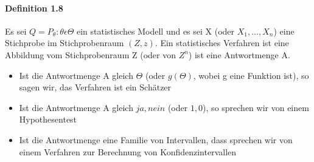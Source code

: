 \documentclass[paper=a4, fontsize=11pt]{scrartcl}
\numberwithin{equation}{section}
\numberwithin{figure}{section}
\numberwithin{table}{section}
\begin{document}
\paragraph{Definition 1.8}

Es sei $Q = {P_{\theta} : \theta \epsilon \Theta}$ ein statistisches Modell und es sei X (oder $X_{1}, ..., X_{n}$) eine Stichprobe im Stichprobenraum $(Z,z)$. Ein statistisches Verfahren ist eine Abbildung vom Stichprobenraum Z (oder von $Z^{n}$) ist eine Antwortmenge A.

\begin{itemize}
\item Ist die Antwortmenge A gleich $\Theta$ (oder $g(\Theta)$, wobei g eine Funktion ist), so sagen wir, das Verfahren ist ein Schätzer
\item Ist die Antwortmenge A gleich ${ja, nein}$ (oder ${1,0}$), so sprechen wir von einem Hypothesentest
\item Ist die Antwortmenge eine Familie von Intervallen, dass sprechen wir von einem Verfahren zur Berechnung von Konfidenzintervallen
\end{itemize}

\end{document}

